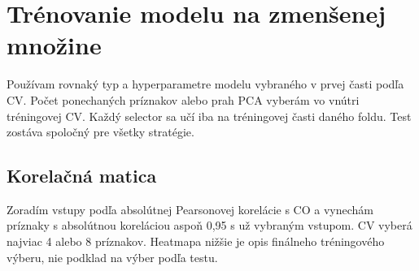 \documentclass[a4paper,11pt]{article}
\begin{document}





\section{Trénovanie modelu na zmenšenej množine}

Používam rovnaký typ a hyperparametre modelu vybraného v prvej časti podľa CV. Počet ponechaných príznakov alebo prah PCA vyberám vo vnútri tréningovej CV. Každý selector sa učí iba na tréningovej časti daného foldu. Test zostáva spoločný pre všetky stratégie.

\subsection{Korelačná matica}

Zoradím vstupy podľa absolútnej Pearsonovej korelácie s CO a vynechám príznaky s absolútnou koreláciou aspoň 0,95 s už vybraným vstupom. CV vyberá najviac 4 alebo 8 príznakov. Heatmapa nižšie je opis finálneho tréningového výberu, nie podklad na výber podľa testu.
\end{document}
